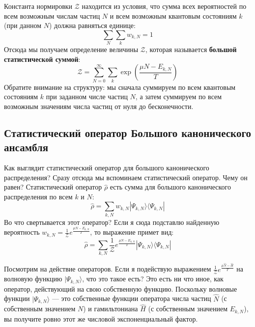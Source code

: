 \documentclass[../general/general]{subfiles}
\begin{document}
Константа нормировки $\mathcal{Z}$ находится из условия, что сумма всех вероятностей по всем возможным числам частиц $N$ и всем возможным квантовым состояниям $k$ (при данном $N$) должна равняться единице:
\begin{equation*}
    \sum_N \sum_k w_{k, N} = 1
\end{equation*}
Отсюда мы получаем определение величины $\mathcal{Z}$, которая называется \textbf{большой статистической суммой}:
\begin{equation}
    \mathcal{Z} = \sum_{N=0}^{\infty} \sum_k \exp\left( \frac{\mu N - E_{k, N}}{T} \right)
    \label{eq:grand_partition_function}
\end{equation}
Обратите внимание на структуру: мы сначала суммируем по всем квантовым состояниям $k$ при заданном числе частиц $N$, а затем суммируем по всем возможным значениям числа частиц от нуля до бесконечности.

\subsection{Статистический оператор Большого канонического ансамбля}

Как выглядит статистический оператор для большого канонического распределения? Сразу отсюда мы вспоминаем статистический оператор. Чему он равен? Статистический оператор $\hat{\rho}$ есть сумма для большого канонического распределения по всем $k$ и $N$:
\begin{equation*}
    \hat{\rho} = \sum_{k, N} w_{k, N} |\Psi_{k, N}\rangle \langle \Psi_{k, N}|
\end{equation*}
Во что свертывается этот оператор? Если я сюда подставлю найденную вероятность $w_{k, N} = \frac{1}{\mathcal{Z}} e^{\frac{\mu N - E_{k, N}}{T}}$, то выражение примет вид:
\begin{equation*}
    \hat{\rho} = \sum_{k, N} \frac{1}{\mathcal{Z}} e^{\frac{\mu N - E_{k, N}}{T}} |\Psi_{k, N}\rangle \langle \Psi_{k, N}|
\end{equation*}

Посмотрим на действие операторов. Если я подействую выражением $\frac{1}{\mathcal{Z}} e^{\frac{\mu \hat{N} - \hat{H}}{T}}$ на волновую функцию $|\Psi_{k, N}\rangle$, что это такое есть? Это есть ни что иное, как оператор, действующий на свою собственную функцию. Поскольку волновые функции $|\Psi_{k, N}\rangle$ — это собственные функции оператора числа частиц $\hat{N}$ (с собственным значением $N$) и гамильтониана $\hat{H}$ (с собственным значением $E_{k, N}$), вы получите ровно этот же числовой экспоненциальный фактор. 
\end{document}
